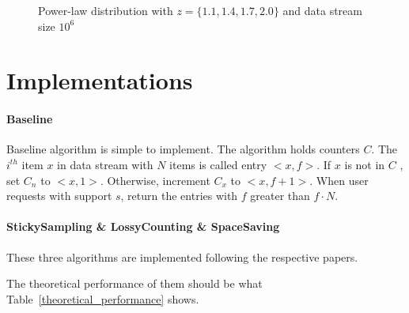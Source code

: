\documentclass[10pt]{article}
\begin{document}
\begin{figure}
     \begin{subfigure}[b]{0.5\textwidth}
          \centering
          \label{power-law-z-1.1-100-stream-1000000}
    \end{subfigure}
    \begin{subfigure}[b]{0.5\textwidth}
          \centering
          \label{power-law-z-1.4-100-stream-1000000}
    \end{subfigure}
    \begin{subfigure}[b]{0.5\textwidth}
          \centering
          \label{power-law-z-1.7-100-stream-1000000}
    \end{subfigure}
    \begin{subfigure}[b]{0.5\textwidth}
          \centering
          \label{power-law-z-2.0-100-stream-1000000}
    \end{subfigure}
 
    \caption{Power-law distribution with $z = \{1.1, 1.4, 1.7, 2.0\}$ and data stream size $10^6$}
    \label{powerlaw}
\end{figure}

\section{Implementations}
\paragraph{Baseline}
Baseline algorithm is simple to implement. The algorithm holds counters $C$.
The $i^{th}$ item $x$ in data stream with $N$ items is called entry $<x, f>$. 
If $x$ is not in $C$ , set $C_n$ to $<x, 1>$. Otherwise, increment $C_x$ to $<x, f+1>$.
When user requests with support $s$, return the entries with $f$ greater than $f\cdot{}N$.
\paragraph{StickySampling \& LossyCounting \& SpaceSaving}
These three algorithms are implemented following the respective papers.

The theoretical performance of them should be what Table~\ref{theoretical_performance} shows.
\end{document}
